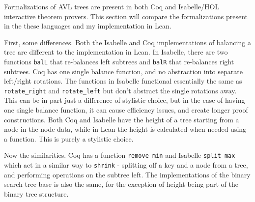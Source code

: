 Formalizations of AVL trees are present in both Coq\cite{code:coq} and Isabelle/HOL\cite{isabelle} interactive theorem provers. This section will compare the formalizations present in the these languages and my implementation in Lean.

First, some differences. Both the Isabelle and Coq implementations of balancing a tree are different to the implementation in Lean. In Isabelle, there are two functions \lstinline{balL} that re-balances left subtrees and \lstinline{balR} that re-balances right subtrees. Coq has one single balance function, and no abstraction into separate left/right rotations. The functions in Isabelle functional essentially the same as \lstinline{rotate_right} and \lstinline{rotate_left} but don't abstract the single rotations away. This can be in part just a difference of stylistic choice, but in the case of having one single balance function, it can cause efficiency issues, and create longer proof constructions. Both Coq and Isabelle have the height of a tree starting from a node in the node data, while in Lean the height is calculated when needed using a function. This is purely a stylistic choice. 

Now the similarities. Coq has a function \lstinline{remove_min} and Isabelle \lstinline{split_max} which act in a similar way to \lstinline{shrink} - splitting off a key and a node from a tree, and performing operations on the subtree left. The implementations of the binary search tree base is also the same, for the exception of height being part of the binary tree structure.
